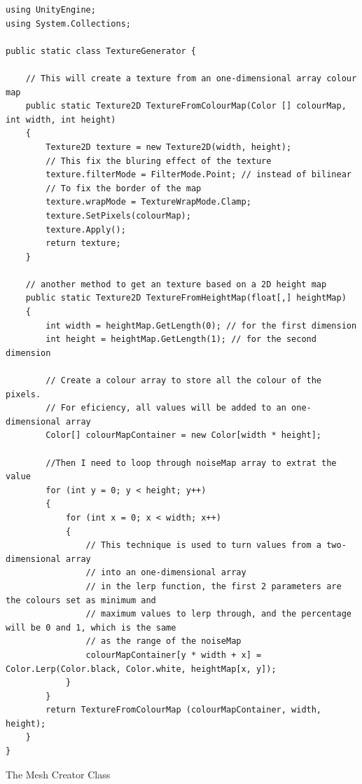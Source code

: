 \documentclass[a4paper,12pt]{book}
\begin{document}
\begin{lstlisting}
using UnityEngine;
using System.Collections;

public static class TextureGenerator {

    // This will create a texture from an one-dimensional array colour map
    public static Texture2D TextureFromColourMap(Color [] colourMap, int width, int height)
    {
        Texture2D texture = new Texture2D(width, height);
        // This fix the bluring effect of the texture
        texture.filterMode = FilterMode.Point; // instead of bilinear
        // To fix the border of the map
        texture.wrapMode = TextureWrapMode.Clamp;
        texture.SetPixels(colourMap);
        texture.Apply();
        return texture;
    }

    // another method to get an texture based on a 2D height map
    public static Texture2D TextureFromHeightMap(float[,] heightMap)
    {
        int width = heightMap.GetLength(0); // for the first dimension
        int height = heightMap.GetLength(1); // for the second dimension

        // Create a colour array to store all the colour of the pixels.
        // For eficiency, all values will be added to an one-dimensional array
        Color[] colourMapContainer = new Color[width * height];

        //Then I need to loop through noiseMap array to extrat the value
        for (int y = 0; y < height; y++)
        {
            for (int x = 0; x < width; x++)
            {
                // This technique is used to turn values from a two-dimensional array
                // into an one-dimensional array
                // in the lerp function, the first 2 parameters are the colours set as minimum and
                // maximum values to lerp through, and the percentage will be 0 and 1, which is the same
                // as the range of the noiseMap
                colourMapContainer[y * width + x] = Color.Lerp(Color.black, Color.white, heightMap[x, y]);
            }
        }
        return TextureFromColourMap (colourMapContainer, width, height);
    }
}

\end{lstlisting}

The Mesh Creator Class
\end{document}
